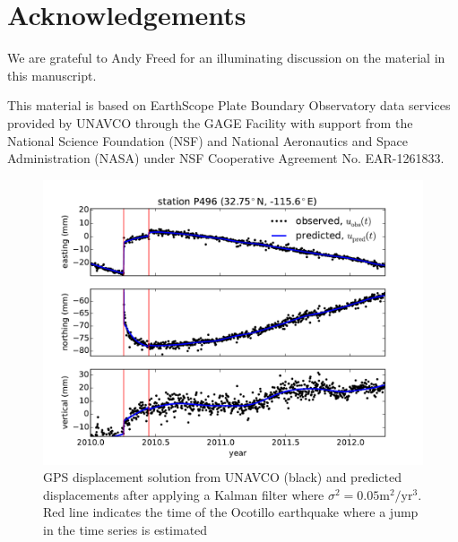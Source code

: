 \documentclass[12pt]{article}
\begin{document}
\section*{Acknowledgements}
We are grateful to Andy Freed for an illuminating discussion on the material in this manuscript.  
 
This material is based on EarthScope Plate Boundary Observatory data services provided by UNAVCO through the GAGE Facility with support from the National Science Foundation (NSF) and National Aeronautics and Space Administration (NASA) under NSF Cooperative Agreement No. EAR-1261833.




\begin{figure}
\includegraphics[scale=0.6]{Figures/figure_1}
\centering
\caption{GPS displacement solution from UNAVCO (black) and predicted displacements after applying a Kalman filter where $\sigma^2=0.05 \mathrm{m}^2/\mathrm{yr}^3$. Red line indicates the time of the Ocotillo earthquake where a jump in the time series is estimated}
\label{P496Fit}
\end{figure}
\end{document}
